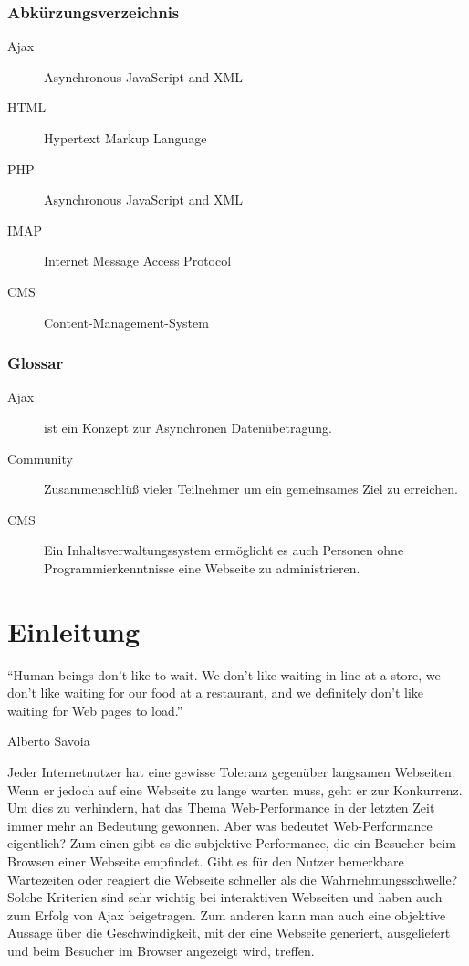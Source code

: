 \section*{Abk\"urzungsverzeichnis}
\begin{description}
  \item[Ajax] Asynchronous JavaScript and XML
  \item[HTML] Hypertext Markup Language
  \item[PHP] Asynchronous JavaScript and XML
  \item[IMAP] Internet Message Access Protocol
  \item[CMS] Content-Management-System
\end{description}
\section*{Glossar}
\begin{description}
  \item[Ajax] ist ein Konzept zur Asynchronen Daten\"ubetragung.
  \item[Community] Zusammenschl\"u\ss{} vieler Teilnehmer um ein gemeinsames Ziel zu erreichen.
  \item[CMS] Ein Inhaltsverwaltungssystem erm\"oglicht es auch Personen ohne Programmierkenntnisse eine Webseite zu administrieren.
\end{description}
\part{Einleitung}
\epigraph{``Human beings don’t like to wait. We don’t like waiting in line at a store, we don’t like waiting for our food at a restaurant, and we definitely don’t like waiting for Web pages to load.''}{Alberto Savoia}

Jeder Internetnutzer hat eine gewisse Toleranz gegenüber langsamen Webseiten. Wenn er jedoch auf eine Webseite zu lange warten muss, geht er zur Konkurrenz.\citep{websiteoptimization2008} Um dies zu verhindern, hat das Thema Web-Performance in der letzten Zeit immer mehr an Bedeutung gewonnen. Aber was bedeutet Web-Performance eigentlich? Zum einen gibt es die subjektive Performance, die ein Besucher beim Browsen einer Webseite empfindet. Gibt es für den Nutzer bemerkbare Wartezeiten oder reagiert die Webseite schneller als die Wahrnehmungsschwelle? Solche Kriterien sind sehr wichtig bei interaktiven Webseiten und haben auch zum Erfolg von Ajax beigetragen. Zum anderen kann man auch eine objektive Aussage über die Geschwindigkeit, mit der eine Webseite generiert, ausgeliefert und beim Besucher im Browser angezeigt wird, treffen. 
\label{sec:intro}
